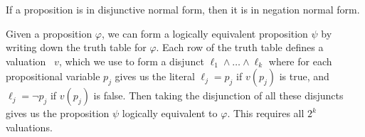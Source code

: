 \begin{node}
\begin{definition}
\begin{theorem}\label{prop-000T}%
If a proposition is in disjunctive normal form, then it is in negation
normal form.
\end{theorem}

\begin{node}\label{prop:normal-form-0005}%
Given a proposition $\varphi$, we can form a logically equivalent
proposition $\psi$ by writing down the truth table for $\varphi$. Each
row of the truth table defines a valuation~ $v$,
which we use to form a disjunct $\ell_{1}\land\dots\land\ell_{k}$
where for each propositional variable $p_{j}$ gives us the literal
$\ell_{j}=p_{j}$ if $v(p_{j})$ is true, and $\ell_{j}=\neg p_{j}$
if $v(p_{j})$ is false. Then taking the disjunction of all these
disjuncts gives us the proposition $\psi$ logically equivalent to
$\varphi$. This requires all $2^{k}$ valuations.
\end{node}


\end{definition}
\end{node}
